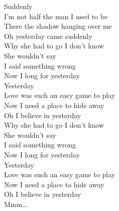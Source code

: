 \documentclass{novel}
\begin{document}
Suddenly\\
I'm not half the man I used to be\\
There the shadow hanging over me\\
Oh yesterday came suddenly\\

Why she had to go I don't know\\
She wouldn't say\\
I said something wrong\\
Now I long for yesterday\\

Yesterday\\
Love was such an easy game to play\\
Now I need a place to hide away\\
Oh I believe in yesterday\\

Why she had to go I don't know\\
She wouldn't say\\
I said something wrong\\
Now I long for yesterday\\

Yesterday\\
Love was such an easy game to play\\
Now I need a place to hide away\\
Oh I believe in yesterday\\

Mmm...
\end{document}
